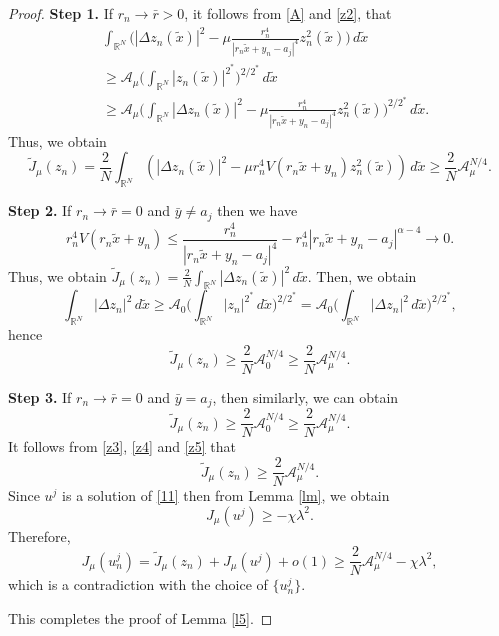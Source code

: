 \documentclass[10pt,a4paper]{amsart}
\numberwithin{equation}{section}
\begin{document}
\begin{proof}
\noindent\textbf{Step 1.} If \(r_n\to \bar{r}>0\),
it follows from \eqref{A} and \eqref{z2}, that
 \begin{align*}
&\int_{\mathbb{R}^N}\Big( |\Delta z_n(\tilde{x})|^2-\mu \frac{r_n^4}
{\left| r_{n}\tilde{x}+y_n-a_j\right| ^4}z_n^2(\tilde{x})\Big)\,d\tilde{x}\\
 &\geq \mathcal{A}_{\mu} \Big( \int _{\mathbb{R}^N}|z_n(\tilde{x})|^{2^*}\Big) ^{2/2^*}\,d\tilde{x}\\
 &\geq \mathcal{A}_{\mu} \Big(\int_{\mathbb{R}^N} |\Delta z_n(\tilde{x})|^2
 -\mu \frac{r_n^4}{\left| r_{n}\tilde{x}+y_n-a_j\right| ^4}z_n^2(\tilde{x})
 \Big)^{2/2^*} \,d\tilde{x}.
 \end{align*}
Thus, we obtain
\begin{equation}\label{z3}
 \tilde{J}_\mu(z_n)=\frac{2}{N}\int_{\mathbb{R}^N}
 \left( |\Delta z_n(\tilde{x})|^2-\mu r_n^4 V(r_n\tilde{x}+y_n)z_n^2(\tilde{x})
 \right)\,d\tilde{x}\geq \frac{2}{N} \mathcal{A}_{\mu}^{N/4}.
 \end{equation}
 
\noindent\textbf{Step 2.} If \(r_n\to \bar{r}=0\) and \(\bar {y}\neq a_j\) then we have
 \[
 r_n^4V(r_n\tilde{x}+y_n)\leq \frac{r_n^4}{\left|r_n\tilde{x}+y_n-a_j\right| ^4 }
 -r_n^4\left|r_n\tilde{x}+y_n-a_j\right|^{\alpha-4}\to 0.
 \]
Thus, we obtain
 \(\tilde{J}_\mu(z_n)=\frac{2}{N}\int_{\mathbb{R}^N} 
 |\Delta z_n(\tilde{x})|^2\,d\tilde{x}\). Then, we obtain
\[
 \int_{\mathbb{R}^N}|\Delta {z}_n|^2\,d\tilde{x}
 \geq \mathcal{A}_{0}\Big( \int _{\mathbb{R}^N}|{z}_n|^{2^*}\,d\tilde{x}\Big) ^{2/2^*}
 =\mathcal{A}_{0}\Big( \int_{\mathbb{R}^N}|\Delta {z}_n|^2\,d\tilde{x}\Big) ^{2/2^*},
\]
hence
 \begin{equation}\label{z4}
 \tilde{J}_\mu(z_n)\geq \frac{2}{N} \mathcal{A}_{0}^{N/4}\geq \frac{2}{N} \mathcal{A}_{\mu}^{N/4}.
 \end{equation}
 
\noindent\textbf{Step 3.}
 If \(r_n\to \bar{r}=0\) and \(\bar {y}=a_j\), then similarly, we can obtain
 \begin{equation}\label{z5}
 \tilde{J}_\mu(z_n)\geq \frac{2}{N} \mathcal{A}_{0}^{N/4}
 \geq \frac{2}{N} \mathcal{A}_{\mu}^{N/4}.
 \end{equation}
It follows from \eqref{z3}, \eqref{z4} and \eqref{z5} that
\[
 \tilde{J}_\mu(z_n)\geq \frac{2}{N} \mathcal{A}_{\mu}^{N/4}.
\]
Since $u^j$ is a solution of \eqref{11} then from Lemma \ref{lm}, we obtain
 \[
 J_{\mu}(u^j)\geq -\chi \lambda^2.
 \]
 Therefore, 
 \[
 J_\mu(u^j_n)=\tilde{J}_\mu(z_n)+J_{\mu}(u^j)+o(1)
 \geq \frac{2}{N} \mathcal{A}_{\mu}^{N/4} -\chi \lambda^2,
 \]
which is a contradiction with the choice of \(\{u_n^j\}\).

This completes the proof of Lemma \ref{l5}.
\end{proof}
\end{document}
